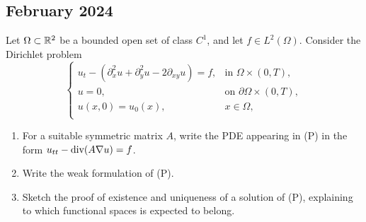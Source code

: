 \newpage
\subsection{February 2024}
\begin{exercise}
    Let \(\Omega \subset \mathbb{R}^2\) be a bounded open set of class \(C^1\), and let \(f \in L^2(\Omega)\). Consider the Dirichlet problem
    \begin{equation*}
        \begin{cases}
            u_{t} - \left(\partial_x^2 u +  \partial_y^2 u - 2 \partial_{xy} u\right) = f, & \text{in } \Omega \times (0, T), \\
            u = 0, & \text{on } \partial \Omega \times (0, T), \\
            u(x,0) = u_0(x), & x \in \Omega, \\
        \end{cases}
        \tag{(P)}
    \end{equation*}
    \begin{enumerate}
        \item For a suitable symmetric matrix \(A\), write the PDE appearing in (P) in the form \(u_{tt} - \text{div}(A \nabla u) = f\).
        \item Write the weak formulation of (P).
        \item Sketch the proof of existence and uniqueness of a solution of (P), explaining to which functional spaces is expected to belong.
    \end{enumerate}
\end{exercise}
